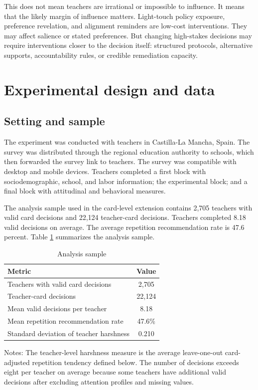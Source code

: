 \documentclass[12pt,a4paper]{article}
\begin{document}
This does not mean teachers are irrational or impossible to influence. It means that the likely margin of influence matters. Light-touch policy exposure, preference revelation, and alignment reminders are low-cost interventions. They may affect salience or stated preferences. But changing high-stakes decisions may require interventions closer to the decision itself: structured protocols, alternative supports, accountability rules, or credible remediation capacity.

\section{Experimental design and data}

\subsection{Setting and sample}

The experiment was conducted with teachers in Castilla-La Mancha, Spain. The survey was distributed through the regional education authority to schools, which then forwarded the survey link to teachers. The survey was compatible with desktop and mobile devices. Teachers completed a first block with sociodemographic, school, and labor information; the experimental block; and a final block with attitudinal and behavioral measures.

The analysis sample used in the card-level extension contains 2,705 teachers with valid card decisions and 22,124 teacher-card decisions. Teachers completed 8.18 valid decisions on average. The average repetition recommendation rate is 47.6 percent. Table \ref{tab:sample} summarizes the analysis sample.

\begin{table}[!htbp]
\centering
\caption{Analysis sample}
\label{tab:sample}
\begin{threeparttable}
\begin{tabular}{lc}
\toprule
Metric & Value \\
\midrule
Teachers with valid card decisions & 2,705 \\
Teacher-card decisions & 22,124 \\
Mean valid decisions per teacher & 8.18 \\
Mean repetition recommendation rate & 47.6\% \\
Standard deviation of teacher harshness & 0.210 \\
\bottomrule
\end{tabular}
\begin{tablenotes}[flushleft]
\footnotesize
\item Notes: The teacher-level harshness measure is the average leave-one-out card-adjusted repetition tendency defined below. The number of decisions exceeds eight per teacher on average because some teachers have additional valid decisions after excluding attention profiles and missing values.
\end{tablenotes}
\end{threeparttable}
\end{table}
\end{document}
